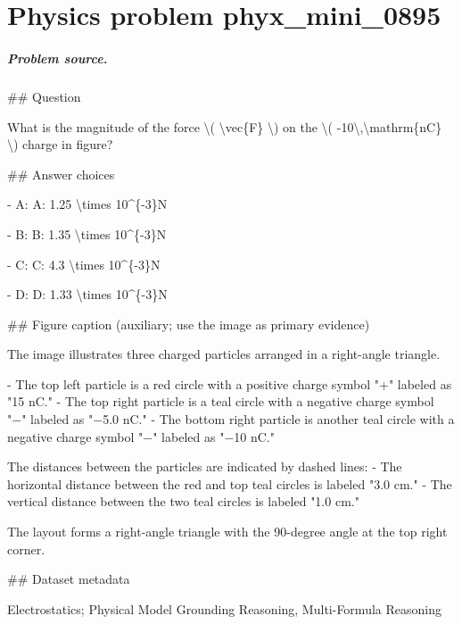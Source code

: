 
\chapter{Physics problem phyx\_mini\_0895}
\label{ch:PhyXMiniProblems_problem_phyx_mini_0895}

\paragraph{Problem source.}
\#\# Question

What is the magnitude of the force \textbackslash{}( \textbackslash{}vec\{F\} \textbackslash{}) on the \textbackslash{}( -10\textbackslash{},\textbackslash{}mathrm\{nC\} \textbackslash{}) charge in figure?

\#\# Answer choices

- A: A: 1.25 \textbackslash{}times 10\textasciicircum{}\{-3\}N

- B: B: 1.35 \textbackslash{}times 10\textasciicircum{}\{-3\}N

- C: C: 4.3 \textbackslash{}times 10\textasciicircum{}\{-3\}N

- D: D: 1.33 \textbackslash{}times 10\textasciicircum{}\{-3\}N

\#\# Figure caption (auxiliary; use the image as primary evidence)

The image illustrates three charged particles arranged in a right-angle triangle. 

- The top left particle is a red circle with a positive charge symbol "+" labeled as "15 nC."
- The top right particle is a teal circle with a negative charge symbol "−" labeled as "−5.0 nC."
- The bottom right particle is another teal circle with a negative charge symbol "−" labeled as "−10 nC."

The distances between the particles are indicated by dashed lines:
- The horizontal distance between the red and top teal circles is labeled "3.0 cm."
- The vertical distance between the two teal circles is labeled "1.0 cm."

The layout forms a right-angle triangle with the 90-degree angle at the top right corner.

\#\# Dataset metadata

Electrostatics; Physical Model Grounding Reasoning, Multi-Formula Reasoning


